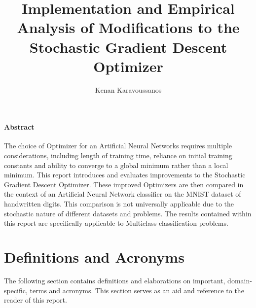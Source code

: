 \documentclass{article}
\title{Implementation and Empirical Analysis of Modifications to the Stochastic Gradient Descent Optimizer}
\author{Kenan Karavoussanos}
\begin{document}
\maketitle
\paragraph{Abstract}	
	
	The choice of Optimizer for an Artificial Neural Networks requires multiple considerations, including length of training time, reliance on initial training constants and ability to converge to a global minimum rather than a local minimum. This report introduces and evaluates improvements to the Stochastic Gradient Descent Optimizer. These improved Optimizers are then compared in the context of an Artificial Neural Network classifier on the MNIST dataset of handwritten digits. This comparison is not universally applicable due to the stochastic nature of different datasets and problems. The results contained within this report are specifically applicable to Multiclass classification problems.
	

\tableofcontents

\section{Definitions and Acronyms}
The following section contains definitions and elaborations on important, domain-specific, terms and acronyms. This section serves as an aid and reference to the reader of this report.
\end{document}
